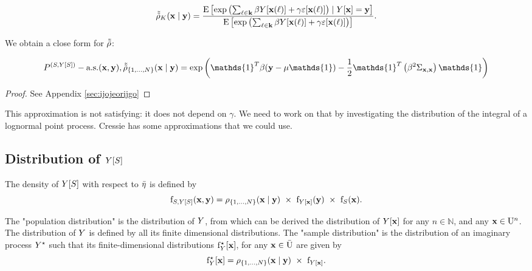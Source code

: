 $$\tilde{\tilde{\rho}}_{K}(\mathbf{x}\mid\mathbf{y})=
\frac{
\mathrm{E}\left[\exp\left(\sum_{\ell\in\mathbf{k}}\beta Y[\mathbf{x}(\ell)]+\gamma \varepsilon[\mathbf{x}(\ell)]\right)\mid Y[\mathbf{x}]=\mathbf{y}\right]}{
\mathrm{E}\left[\exp\left(\sum_{\ell\in\mathbf{k}}\beta Y[\mathbf{x}(\ell)]+\gamma \varepsilon[\mathbf{x}(\ell)]\right)\right]}.$$

We obtain a close form for 
$\tilde{\tilde{\rho}}$:

\begin{equation}
P^{(\Sample,\Signal[\Sample])}-\text{a.s.}(\position,\signal),
\tilde{\tilde{\intensityratio}}_{\{1,\ldots,N\}}(\position\mid\signal)=
\exp\left(\mathds{1}^T\beta(\signal-\mu\mathds{1})
-\frac12\mathds{1}^T\left(
\beta^2\provar_{\position,\position}
\right)\mathds{1}\right)\label{eq:kjeojmcxzmxz}
\end{equation}
\begin{proof}
See Appendix \ref{sec:ijojeorijgo}
\end{proof}


{\color{red}
This approximation is not satisfying: it does not depend on $\gamma$.
We need to work on that by investigating the distribution of the integral of a lognormal point process.
Cressie has some approximations that we could use.
}

\subsection{Distribution of $Y[S]$}
The density of $Y[S]$ with respect to $\bar{\eta}$ is defined by
\begin{equation}\mathrm{f}_{S,Y[S]}(\mathbf{x},\mathbf{y})=\rho_{\{1,\ldots,N\}}(\mathbf{x}\mid\mathbf{y})~\times~ \mathrm{f}_{Y[\mathbf{x}]}(\mathbf{y})~\times~\mathrm{f}_{S}(\mathbf{x}).\label{eq:iuhsdewripeowi}\end{equation}

The "population distribution" is the distribution of $Y$, from which can be derived the distribution of $Y[\mathbf{x}]$ for any $n\in\mathbb{N}$, and any $\mathbf{x}\in \mathrm{U}^n$. The distribution of $Y$ is defined by all its finite dimensional distributions.
The "sample distribution" is the distribution of an imaginary process $Y^\star$ such that its finite-dimensional distributions $\mathrm{f}_Y^\star[\mathbf{x}]$, for any $\mathbf{x} \in\bar{\mathrm{U}}$ are given by
$$\mathrm{f}_Y^\star[\mathbf{x}]=
 \rho_{\{1,\ldots,N\}}(\mathbf{x}\mid\mathbf{y})~\times~ \mathrm{f}_{Y[\mathbf{x}]}.$$

